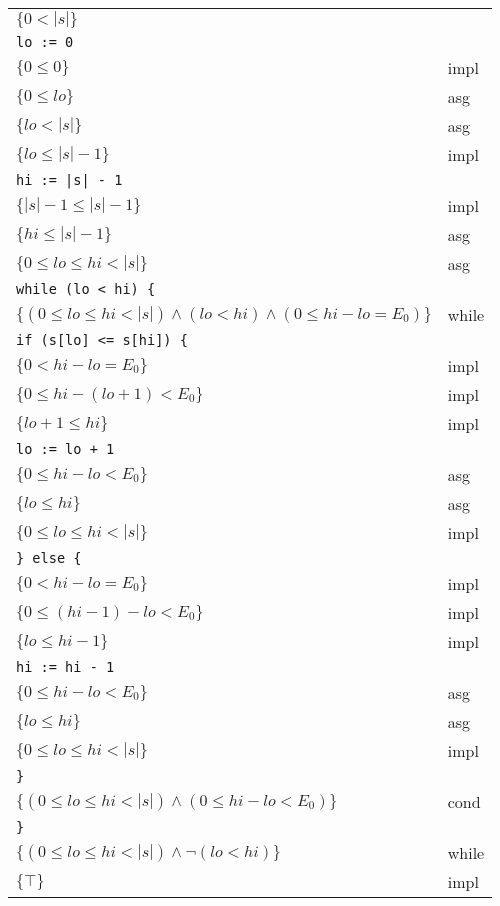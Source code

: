 \documentclass[12pt]{article}
\begin{document}
\begin{center}
    \begin{tabular}{ll}
        $\{ 0 < |s| \}$ & \\
        {\color{gray} \texttt{lo := 0}} & \\
        $\{ 0 \le 0 \}$ & impl \\
        $\{ 0 \le lo \}$ & asg \\
        $\{ lo < |s| \}$ & asg \\
        $\{ lo \le |s| - 1 \}$ & impl \\
        {\color{gray} \texttt{hi := |s| - 1}} & \\
        $\{ |s| - 1 \le |s| - 1 \}$ & impl \\
        $\{ hi \le |s| - 1 \}$ & asg \\
        $\{ 0 \le lo \le hi < |s| \}$ & asg \\
        {\color{gray} \texttt{while (lo < hi) \{}} & \\
        \qquad $\{ (0 \le lo \le hi < |s|) \wedge (lo < hi) \wedge (0 \le hi - lo = E_0) \}$ & while \\
        {\color{gray} \qquad \texttt{if (s[lo] <= s[hi]) \{}} & \\
        \qquad \qquad $\{ 0 < hi - lo = E_0 \}$ & impl \\
        \qquad \qquad $\{ 0 \le hi - (lo + 1) < E_0 \}$ & impl \\
        \qquad \qquad $\{ lo + 1 \le hi \}$ & impl \\
        {\color{gray} \qquad \qquad \texttt{lo := lo + 1}} & \\
        \qquad \qquad $\{ 0 \le hi - lo < E_0 \}$ & asg \\
        \qquad \qquad $\{ lo \le hi \}$ & asg \\
        \qquad \qquad $\{ 0 \le lo \le hi < |s| \}$ & impl \\
        {\color{gray} \qquad \texttt{\} else \{}} & \\
        \qquad \qquad $\{ 0 < hi - lo = E_0 \}$ & impl \\
        \qquad \qquad $\{ 0 \le (hi - 1) - lo < E_0 \}$ & impl \\
        \qquad \qquad $\{ lo \le hi - 1 \}$ & impl \\
        {\color{gray} \qquad \qquad \texttt{hi := hi - 1}} & \\
        \qquad \qquad $\{ 0 \le hi - lo < E_0 \}$ & asg \\
        \qquad \qquad $\{ lo \le hi \}$ & asg \\
        \qquad \qquad $\{ 0 \le lo \le hi < |s| \}$ & impl \\
        {\color{gray} \qquad \texttt{\}}} & \\
        \qquad $\{ (0 \le lo \le hi < |s|) \wedge (0 \le hi - lo < E_0) \}$ & cond \\
        {\color{gray} \texttt{\}}} & \\
        $\{ (0 \le lo \le hi < |s|) \wedge \neg(lo < hi) \}$ & while \\
        $\{ \top \}$ & impl
    \end{tabular}
\end{center}
\end{document}
